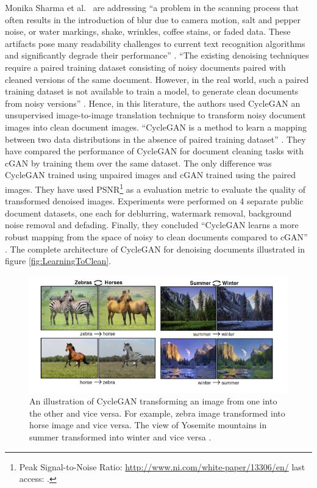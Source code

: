 Monika Sharma et al.\ \cite{sharma2019learning} are addressing ``a problem in the scanning process that often results in the introduction of blur due to camera motion, salt and pepper noise, or water markings, shake, wrinkles, coffee stains, or faded data. These artifacts pose many readability challenges to current text recognition algorithms and significantly degrade their performance'' \cite{sharma2019learning}. ``The existing denoising techniques require a paired training dataset consisting of noisy documents paired with cleaned versions of the same document. However, in the real world, such a paired training dataset is not available to train a model, to generate clean documents from noisy versions'' \cite{zhu2020unpaired} \cite{sharma2019learning}. Hence, in this literature, the authors used \ac{CycleGAN} an unsupervised image-to-image translation technique to transform noisy document images into clean document images. ``\ac{CycleGAN} is a method to learn a mapping between two data distributions in the absence of paired training dataset'' \cite{zhu2020unpaired} \cite{sharma2019learning}. They have compared the performance of \ac{CycleGAN} for document cleaning tasks with \ac{cGAN} by training them over the same dataset. The only difference was \ac{CycleGAN} trained using unpaired images and \ac{cGAN} trained using the paired images. They have used \ac{PSNR}\footnote{Peak Signal-to-Noise Ratio: \url{http://www.ni.com/white-paper/13306/en/} last access: \dcdate.} as a evaluation metric to evaluate the quality of transformed denoised images. Experiments were performed on 4 separate public document datasets, one each for deblurring, watermark removal, background noise removal and defading. Finally, they concluded ``\ac{CycleGAN} learns a more robust mapping from the space of noisy to clean documents compared to \ac{cGAN}'' \cite{sharma2019learning}. The complete architecture of \ac{CycleGAN} for denoising documents illustrated in figure \ref{fig:LearningToClean}.


\begin{figure}[H]
        \begin{center}
 	    \includegraphics[scale=0.35]{images/relatedWorks/CycleGANExamples.png}
	    \caption[An illustration of \ac{CycleGAN} transforming an image from one into the other and vice versa.]{An illustration of \ac{CycleGAN} transforming an image from one into the other and vice versa. For example, zebra image transformed into horse image and vice versa. The view of Yosemite mountains in summer transformed into winter and vice versa \cite{zhu2020unpaired}.}
	    \label{fig:CycleganExamples}
	    \end{center}
\end{figure}


